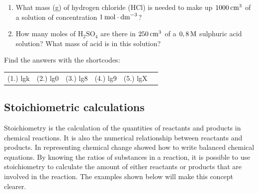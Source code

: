 \begin{enumerate}[noitemsep, label=\textbf{\arabic*}. ]
\label{m38712*uid99}\item What mass (g) of hydrogen chloride (\begin{math}\mathrm{HCl}\end{math}) is needed to make up \begin{math}1000\phantom{\rule{2pt}{0ex}}{\mathrm{cm}}^{3}\end{math} of a solution of concentration \begin{math}1\phantom{\rule{2pt}{0ex}}\mathrm{mol}\ensuremath{\cdot}{\mathrm{dm}}^{-3}\end{math}?\newline
            
\label{m38712*uid100}\item How many moles of \begin{math}\mathrm{H}{}_{2}\mathrm{SO}{}_{4}\end{math} are there in \begin{math}250\phantom{\rule{2pt}{0ex}}{\mathrm{cm}}^{3}\end{math} of a \begin{math}0,8\phantom{\rule{2pt}{0ex}}\mathrm{M}\end{math} sulphuric acid solution? What mass of acid is in this solution?\newline
            
\end{enumerate}
        
      

    
    \label{m38712*cid9}
\par {} Find the answers with the shortcodes:
 \par \begin{tabular}[h]{cccccc}
 (1.) lgk  &  (2.) lg0  &  (3.) lg8  &  (4.) lg9  &  (5.) lgX  & \end{tabular}



            \subsection{ Stoichiometric calculations}
            \nopagebreak
            
      
      \label{m38712*id283990}Stoichiometry is the calculation of the quantities of reactants and products in chemical reactions. It is also the numerical relationship between reactants and products. In  representing chemical change showed how to write balanced chemical equations. By knowing the ratios of substances in a reaction, it is possible to use stoichiometry to calculate the amount of either reactants or products that are involved in the reaction. The examples shown below will make this concept clearer.\par 
\label{m38712*secfhsst!!!underscore!!!id1903}\vspace{.5cm} 
      
